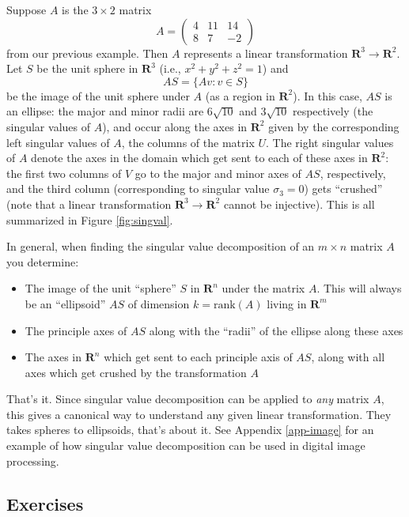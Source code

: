 \documentclass[12pt]{article}
\numberwithin{equation}{subsection}
\numberwithin{figure}{subsection}
\theoremstyle{note}
\newcommand{\R}{\mathbf{R}}
\newcommand\rank[1]{\mathrm{rank}(#1)}
\newcommand\m[1]{\begin{pmatrix}#1\end{pmatrix}}
\begin{document}
 Suppose $A$ is the $3\times 2$ matrix \[ A=\m{4 & 11 & 14 \\ 8 & 7 & -2}\] from our previous example. Then $A$ represents a linear transformation $\R^3\to\R^2$. Let $S$ be the unit sphere in $\R^3$ (i.e., $x^2+y^2+z^2=1$) and \[AS =\{Av : v\in S\}\] be the image of the unit sphere under $A$ (as a region in $\R^2$). In this case, $AS$ is an ellipse: the major and minor radii are $6\sqrt{10}$ and $3\sqrt{10}$ respectively (the singular values of $A$), and occur along the axes in $\R^2$ given by the corresponding left singular values of $A$, the columns of the matrix $U$. The right singular values of $A$ denote the axes in the domain which get sent to each of these axes in $\R^2$: the first two columns of $V$ go to the major and minor axes of $AS$, respectively, and the third column (corresponding to singular value $\sigma_3=0$) gets ``crushed'' (note that a linear transformation $\R^3\to\R^2$ cannot be injective). This is all summarized in Figure \ref{fig:singval}.



In general, when finding the singular value decomposition of an $m\times n$ matrix $A$ you determine: 
\begin{itemize}
	\item The image of the unit ``sphere'' $S$ in $\R^n$ under the matrix $A$. This will always be an ``ellipsoid'' $AS$ of dimension $k=\rank{A}$ living in $\R^m$
	\item The principle axes of $AS$ along with the ``radii'' of the ellipse along these axes
	\item The axes in $\R^n$ which get sent to each principle axis of $AS$, along with all axes which get crushed by the transformation $A$
\end{itemize}
That's it. Since singular value decomposition can be applied to \textit{any} matrix $A$, this gives a canonical way to understand any given linear transformation. They takes spheres to ellipsoids, that's about it. See Appendix \ref{app-image} for an example of how singular value decomposition can be used in digital image processing. 


\subsection{Exercises} 
\end{document}

